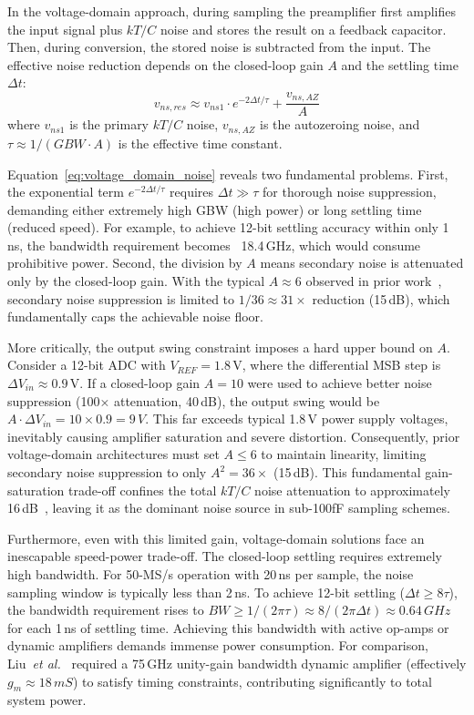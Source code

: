 \documentclass[journal]{IEEEtran}
\begin{document}
In the voltage-domain approach, during sampling the preamplifier first amplifies the input signal plus $kT/C$ noise and stores the result on a feedback capacitor. Then, during conversion, the stored noise is subtracted from the input. The effective noise reduction depends on the closed-loop gain $A$ and the settling time $\Delta t$:
\begin{equation}
v_{ns,res} \approx v_{ns1} \cdot e^{-2\Delta t/\tau} + \frac{v_{ns,AZ}}{A}
\label{eq:voltage_domain_noise}
\end{equation}
where $v_{ns1}$ is the primary $kT/C$ noise, $v_{ns,AZ}$ is the autozeroing noise, and $\tau \approx 1/(GBW \cdot A)$ is the effective time constant.

Equation~\ref{eq:voltage_domain_noise} reveals two fundamental problems. First, the exponential term $e^{-2\Delta t/\tau}$ requires $\Delta t \gg \tau$ for thorough noise suppression, demanding either extremely high GBW (high power) or long settling time (reduced speed). For example, to achieve 12-bit settling accuracy within only 1\,ns, the bandwidth requirement becomes ~18.4\,GHz, which would consume prohibitive power. Second, the division by $A$ means secondary noise is attenuated only by the closed-loop gain. With the typical $A \approx 6$ observed in prior work~\cite{liu202013bit}, secondary noise suppression is limited to $1/36 \approx 31\times$ reduction (15\,dB), which fundamentally caps the achievable noise floor.

More critically, the output swing constraint imposes a hard upper bound on $A$. Consider a 12-bit ADC with $V_{REF} = 1.8$\,V, where the differential MSB step is $\Delta V_{in} \approx 0.9$\,V. If a closed-loop gain $A=10$ were used to achieve better noise suppression (100× attenuation, 40\,dB), the output swing would be $A \cdot \Delta V_{in} = 10 \times 0.9 = 9\,V$. This far exceeds typical 1.8\,V power supply voltages, inevitably causing amplifier saturation and severe distortion. Consequently, prior voltage-domain architectures must set $A \leq 6$ to maintain linearity, limiting secondary noise suppression to only $A^2 = 36\times$ (15\,dB). This fundamental gain-saturation trade-off confines the total $kT/C$ noise attenuation to approximately 16\,dB~\cite{liu202013bit}, leaving it as the dominant noise source in sub-100fF sampling schemes.

Furthermore, even with this limited gain, voltage-domain solutions face an inescapable speed-power trade-off. The closed-loop settling requires extremely high bandwidth. For 50-MS/s operation with 20\,ns per sample, the noise sampling window is typically less than 2\,ns. To achieve 12-bit settling ($\Delta t \geq 8\tau$), the bandwidth requirement rises to $BW \geq 1/(2\pi \tau) \approx 8/(2\pi \Delta t) \approx 0.64\,GHz$ for each 1\,ns of settling time. Achieving this bandwidth with active op-amps or dynamic amplifiers demands immense power consumption. For comparison, Liu\textit{~et al.}~\cite{liu202013bit} required a 75\,GHz unity-gain bandwidth dynamic amplifier (effectively $g_m \approx 18\,mS$) to satisfy timing constraints, contributing significantly to total system power.
\end{document}
